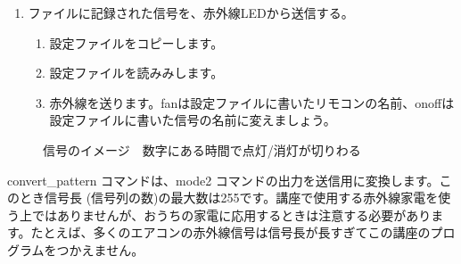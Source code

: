 \begin{enumerate}
\begin{enumerate}[1]
\begin{enumerate}[(1)]
  \end{enumerate}
 \end{enumerate}
\item ファイルに記録された信号を、赤外線LEDから送信する。
 \begin{enumerate}[1]
  \item 設定ファイルをコピーします。 \\ 
  \item 設定ファイルを読みみします。\\ 
  \item 赤外線を送ります。fanは設定ファイルに書いたリモコンの名前、onoffは設定ファイルに書いた信号の名前に変えましょう。\\ 
 \end{enumerate}
\end{enumerate}


\begin{figure}[H]
    \centering
 
    \caption{信号のイメージ　数字にある時間で点灯/消灯が切りわる}
\end{figure}

convert\_pattern コマンドは、mode2 コマンドの出力を送信用に変換します。このとき信号長 (信号列の数)の最大数は255です。講座で使用する赤外線家電を使う上ではありませんが、おうちの家電に応用するときは注意する必要があります。たとえば、多くのエアコンの赤外線信号は信号長が長すぎてこの講座のプログラムをつかえません。\\

\begin{tcolorbox}[title=\useOmetoi]
    \begin{enumerate}
    \end{enumerate}
    \end{tcolorbox}
